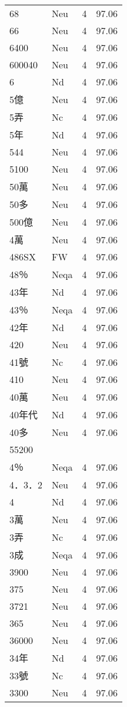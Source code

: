 \documentclass[twocolumn]{book}
\begin{document}
\begin{supertabular}{llrr}
68 & Neu & 4 &  97.06\\
66 & Neu & 4 &  97.06\\
6400 & Neu & 4 &  97.06\\
600040 & Neu & 4 &  97.06\\
6 & Nd & 4 &  97.06\\
5億 & Neu & 4 &  97.06\\
5弄 & Nc & 4 &  97.06\\
5年 & Nd & 4 &  97.06\\
544 & Neu & 4 &  97.06\\
5100 & Neu & 4 &  97.06\\
50萬 & Neu & 4 &  97.06\\
50多 & Neu & 4 &  97.06\\
500億 & Neu & 4 &  97.06\\
4萬 & Neu & 4 &  97.06\\
486SX & FW & 4 &  97.06\\
48％ & Neqa & 4 &  97.06\\
43年 & Nd & 4 &  97.06\\
43％ & Neqa & 4 &  97.06\\
42年 & Nd & 4 &  97.06\\
420 & Neu & 4 &  97.06\\
41號 & Nc & 4 &  97.06\\
410 & Neu & 4 &  97.06\\
40萬 & Neu & 4 &  97.06\\
40年代 & Nd & 4 &  97.06\\
40多 & Neu & 4 &  97.06\\
55200\\
4％ & Neqa & 4 &  97.06\\
4．3．2 & Neu & 4 &  97.06\\
4 & Nd & 4 &  97.06\\
3萬 & Neu & 4 &  97.06\\
3弄 & Nc & 4 &  97.06\\
3成 & Neqa & 4 &  97.06\\
3900 & Neu & 4 &  97.06\\
375 & Neu & 4 &  97.06\\
3721 & Neu & 4 &  97.06\\
365 & Neu & 4 &  97.06\\
36000 & Neu & 4 &  97.06\\
34年 & Nd & 4 &  97.06\\
33號 & Nc & 4 &  97.06\\
3300 & Neu & 4 &  97.06\\

\end{supertabular}
\end{document}

